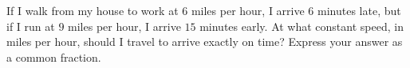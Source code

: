 If I walk from my house to work at $6$ miles per hour, I arrive $6$ minutes late, but if I run at $9$ miles per hour, I arrive $15$ minutes early. At what constant speed, in miles per hour, should I travel to arrive exactly on time? Express your answer as a common fraction.
